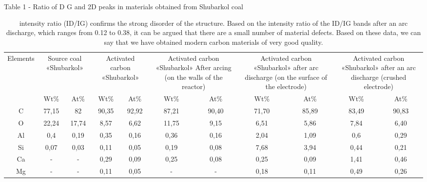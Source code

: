 \begin{table}[H]
\caption*{Table 1 - Ratio of D G and 2D peaks in materials obtained from Shubarkol coal}
\caption*{intensity ratio (ID/IG) confirms the strong disorder of the structure.
Based on the intensity ratio of the ID/IG bands after an arc discharge,
which ranges from 0.12 to 0.38, it can be argued that there are a small
number of material defects. Based on these data, we can say that we have
obtained modern carbon materials of very good quality.}
\centering
\begin{tabular}{|c|cc|cc|cc|cc|cc|}
\hline
\multirow{2}{*}{Elements} & \multicolumn{2}{p{0.1\textwidth}|}{Source coal «Shubarkol»} & \multicolumn{2}{p{0.13\textwidth}|}{Activated carbon «Shubarkol»} & \multicolumn{2}{p{0.15\textwidth}|}{Activated carbon «Shubarkol» After arcing (on the walls of the reactor)} & \multicolumn{2}{p{0.15\textwidth}|}{Activated carbon «Shubarkol» after arc discharge (on the surface of the electrode)} & \multicolumn{2}{p{0.15\textwidth}|}{Activated carbon  «Shubarkol» after an arc discharge (crushed electrode)} \\ \cline{2-11} 
 & \multicolumn{1}{c|}{Wt\%} & At\% & \multicolumn{1}{c|}{Wt\%} & At\% & \multicolumn{1}{c|}{Wt\%} & At\% & \multicolumn{1}{c|}{Wt\%} & At\% & \multicolumn{1}{c|}{Wt\%} & At\% \\ \hline
C & \multicolumn{1}{c|}{77,15} & 82 & \multicolumn{1}{c|}{90,35} & 92,92 & \multicolumn{1}{c|}{87,21} & 90,40 & \multicolumn{1}{c|}{71,70} & 85,89 & \multicolumn{1}{c|}{83,49} & 90,83 \\ \hline
O & \multicolumn{1}{c|}{22,24} & 17,74 & \multicolumn{1}{c|}{8,57} & 6,62 & \multicolumn{1}{c|}{11,75} & 9,15 & \multicolumn{1}{c|}{6,51} & 5,86 & \multicolumn{1}{c|}{7,84} & 6,40 \\ \hline
Al & \multicolumn{1}{c|}{0,4} & 0,19 & \multicolumn{1}{c|}{0,35} & 0,16 & \multicolumn{1}{c|}{0,36} & 0,16 & \multicolumn{1}{c|}{2,04} & 1,09 & \multicolumn{1}{c|}{0,6} & 0,29 \\ \hline
Si & \multicolumn{1}{c|}{0,07} & 0,03 & \multicolumn{1}{c|}{0,11} & 0,05 & \multicolumn{1}{c|}{0,19} & 0,08 & \multicolumn{1}{c|}{7,68} & 3,94 & \multicolumn{1}{c|}{0,44} & 0,21 \\ \hline
Ca & \multicolumn{1}{c|}{-} & - & \multicolumn{1}{c|}{0,29} & 0,09 & \multicolumn{1}{c|}{0,25} & 0,08 & \multicolumn{1}{c|}{0,25} & 0,09 & \multicolumn{1}{c|}{1,41} & 0,46 \\ \hline
Mg & \multicolumn{1}{c|}{-} & - & \multicolumn{1}{c|}{0,11} & 0,05 & \multicolumn{1}{c|}{-} & - & \multicolumn{1}{c|}{0,18} & 0,11 & \multicolumn{1}{c|}{0,49} & 0,26 \\ \hline

\end{tabular}
\end{table}
